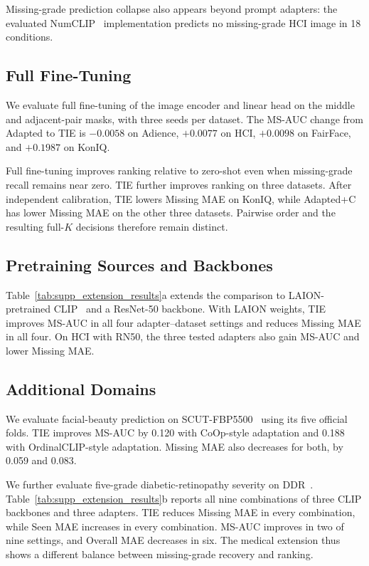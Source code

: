Missing-grade prediction collapse also appears beyond prompt adapters: the evaluated NumCLIP~\cite{du2024numclip} implementation predicts no missing-grade HCI image in 18 conditions.



\subsection{Full Fine-Tuning}
\label{sec:supp_full_finetuning}

We evaluate full fine-tuning of the image encoder and linear head on the middle and adjacent-pair masks, with three seeds per dataset.
The MS-AUC change from Adapted to TIE is $-0.0058$ on Adience, $+0.0077$ on HCI, $+0.0098$ on FairFace, and $+0.1987$ on KonIQ.

Full fine-tuning improves ranking relative to zero-shot even when missing-grade recall remains near zero.
TIE further improves ranking on three datasets.
After independent calibration, TIE lowers Missing MAE on KonIQ, while Adapted+C has lower Missing MAE on the other three datasets.
Pairwise order and the resulting full-$K$ decisions therefore remain distinct.

\subsection{Pretraining Sources and Backbones}
\label{sec:supp_pretraining_backbones}

Table~\ref{tab:supp_extension_results}a extends the comparison to LAION-pretrained CLIP~\cite{cherti2023reproducible} and a ResNet-50 backbone. With LAION weights, TIE improves MS-AUC in all four adapter--dataset settings and reduces Missing MAE in all four. On HCI with RN50, the three tested adapters also gain MS-AUC and lower Missing MAE.


\subsection{Additional Domains}
\label{sec:supp_additional_domains}

We evaluate facial-beauty prediction on SCUT-FBP5500~\cite{liang2018scut} using its five official folds. TIE improves MS-AUC by 0.120 with CoOp-style adaptation and 0.188 with OrdinalCLIP-style adaptation. Missing MAE also decreases for both, by 0.059 and 0.083.

We further evaluate five-grade diabetic-retinopathy severity on DDR~\cite{li2019ddr}. Table~\ref{tab:supp_extension_results}b reports all nine combinations of three CLIP backbones and three adapters. TIE reduces Missing MAE in every combination, while Seen MAE increases in every combination. MS-AUC improves in two of nine settings, and Overall MAE decreases in six. The medical extension thus shows a different balance between missing-grade recovery and ranking.
